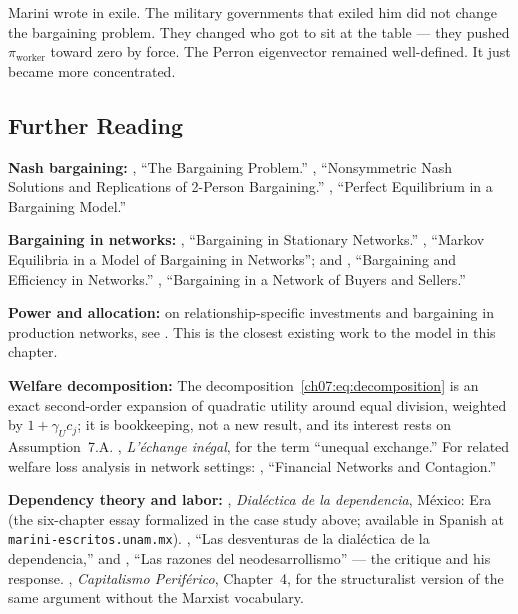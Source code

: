 \documentclass[../structural_economics_book.tex]{subfiles}
\begin{document}
Marini wrote in exile. The military governments that exiled him did not change the bargaining problem. They changed who got to sit at the table --- they pushed $\pi_{\text{worker}}$ toward zero by force. The Perron eigenvector remained well-defined. It just became more concentrated.


\subsection*{Further Reading}

\textbf{Nash bargaining:} \citet{nash1950bargaining}, ``The Bargaining Problem.'' \citet{kalai1977nonsymmetric}, ``Nonsymmetric Nash Solutions and Replications of 2-Person Bargaining.'' \citet{rubinstein1982perfect}, ``Perfect Equilibrium in a Bargaining Model.''

\textbf{Bargaining in networks:} \citet{manea2011bargaining}, ``Bargaining in Stationary Networks.'' \citet{abreu2012markov}, ``Markov Equilibria in a Model of Bargaining in Networks''; and \citet{abreu2012bargaining}, ``Bargaining and Efficiency in Networks.'' \citet{corominasbosch2004bargaining}, ``Bargaining in a Network of Buyers and Sellers.''

\textbf{Power and allocation:} on relationship-specific investments and bargaining in production networks, see \citet{acemoglu2025macroeconomics}. This is the closest existing work to the model in this chapter.

\textbf{Welfare decomposition:} The decomposition~\eqref{ch07:eq:decomposition} is an exact second-order expansion of quadratic utility around equal division, weighted by $1 + \gamma_U c_j$; it is bookkeeping, not a new result, and its interest rests on Assumption~7.A. \citet{emmanuel1969echange}, \textit{L'\'{e}change in\'{e}gal}, for the term ``unequal exchange.'' For related welfare loss analysis in network settings: \citet{elliott2014financial}, ``Financial Networks and Contagion.''

\textbf{Dependency theory and labor:} \citet{marini1973dialectica}, \textit{Dial\'{e}ctica de la dependencia}, M\'{e}xico: Era (the six-chapter essay formalized in the case study above; available in Spanish at \texttt{marini-escritos.unam.mx}). \citet{cardoso1978desventuras}, ``Las desventuras de la dial\'{e}ctica de la dependencia,'' and \citet{marini1978razones}, ``Las razones del neodesarrollismo'' --- the critique and his response. \citet{prebisch1981capitalismo}, \textit{Capitalismo Perif\'{e}rico}, Chapter~4, for the structuralist version of the same argument without the Marxist vocabulary.
\end{document}
